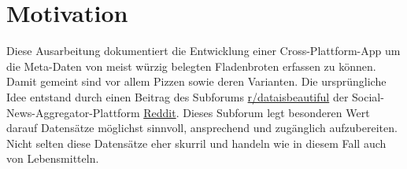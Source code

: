 \section{Motivation}

Diese Ausarbeitung dokumentiert die Entwicklung einer Cross-Plattform-App
um die Meta-Daten von meist würzig belegten Fladenbroten erfassen zu können.
Damit gemeint sind vor allem Pizzen sowie deren Varianten.
Die ursprüngliche Idee entstand durch einen Beitrag des Subforums
\href{https://de.reddit.com/r/dataisbeautiful/}{r/dataisbeautiful}
der Social-News-Aggregator-Plattform \href{https://de.reddit.com/}{Reddit}.
Dieses Subforum legt besonderen Wert darauf Datensätze möglichst sinnvoll,
ansprechend und zugänglich aufzubereiten. Nicht selten diese
Datensätze eher skurril und handeln wie in diesem Fall auch von Lebensmitteln.
